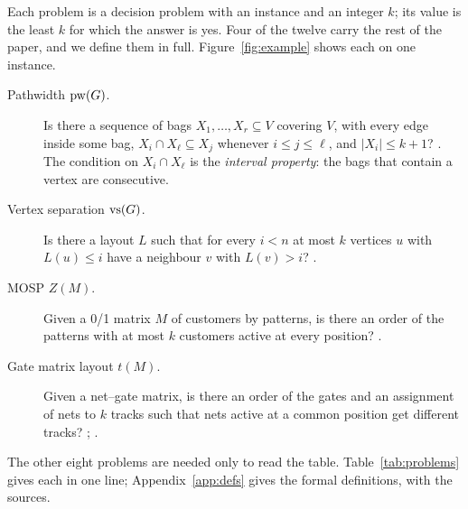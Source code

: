 Each problem is a decision problem with an instance and an integer $k$; its
value is the least $k$ for which the answer is yes. Four of the twelve carry
the rest of the paper, and we define them in full. Figure~\ref{fig:example}
shows each on one instance.

\begin{description}
\item[Pathwidth $\mathrm{pw}(G)$.] Is there a sequence of bags $X_1,\dots,X_r\subseteq V$
  covering $V$, with every edge inside some bag, $X_i\cap X_\ell\subseteq X_j$
  whenever $i\le j\le\ell$, and $|X_i|\le k+1$? \citep[p.~346]{LY2002ref13}.
  The condition on $X_i\cap X_\ell$ is the \emph{interval property}: the bags
  that contain a vertex are consecutive.
\item[Vertex separation $\mathrm{vs}(G)$.] Is there a layout $L$ such that for every
  $i<n$ at most $k$ vertices $u$ with $L(u)\le i$ have a neighbour $v$ with
  $L(v)>i$? \citep[p.~346]{LY2002ref13}.
\item[MOSP $Z(M)$.] Given a 0/1 matrix $M$ of customers by patterns, is there
  an order of the patterns with at most $k$ customers active at every position?
  \citep[eqs.~(1)--(2)]{LY2002}.
\item[Gate matrix layout $t(M)$.] Given a net--gate matrix, is there an order of
  the gates and an assignment of nets to $k$ tracks such that nets active at a
  common position get different tracks? \citep[p.~18]{LY2002ref6};
  \citep[Problem~1]{LY2002ref8}.
\end{description}

The other eight problems are needed only to read the table.
Table~\ref{tab:problems} gives each in one line; Appendix~\ref{app:defs} gives
the formal definitions, with the sources.

